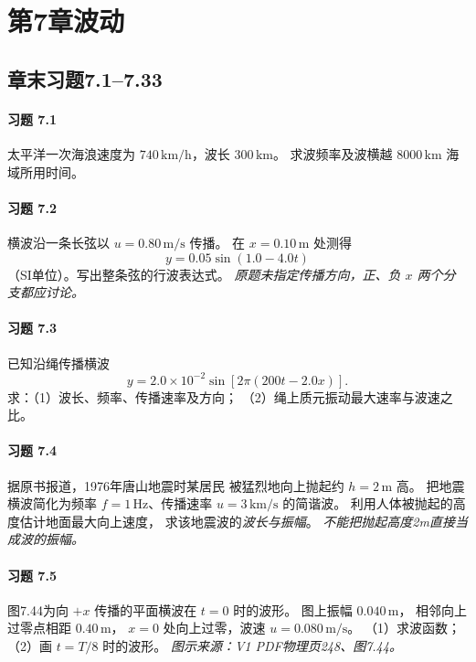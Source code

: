 \section*{第7章\quad 波动}
\subsection*{章末习题7.1--7.33}

\paragraph{习题 7.1}
太平洋一次海浪速度为
\(740\,\mathrm{km/h}\)，波长
\(300\,\mathrm{km}\)。
求波频率及波横越
\(8000\,\mathrm{km}\) 海域所用时间。

\paragraph{习题 7.2}
横波沿一条长弦以
\(u=0.80\,\mathrm{m/s}\) 传播。
在 \(x=0.10\,\mathrm m\) 处测得
\[
 y=0.05\sin(1.0-4.0t)
\]
（SI单位）。写出整条弦的行波表达式。
\textit{原题未指定传播方向，正、负 \(x\) 两个分支都应讨论。}

\paragraph{习题 7.3}
已知沿绳传播横波
\[
 y=2.0\times10^{-2}
 \sin[2\pi(200t-2.0x)].
\]
求：（1）波长、频率、传播速率及方向；
（2）绳上质元振动最大速率与波速之比。

\paragraph{习题 7.4}
据原书报道，1976年唐山地震时某居民
被猛烈地向上抛起约 \(h=2\,\mathrm m\) 高。
把地震横波简化为频率
\(f=1\,\mathrm{Hz}\)、传播速率
\(u=3\,\mathrm{km/s}\) 的简谐波。
利用人体被抛起的高度估计地面最大向上速度，
求该地震波的\emph{波长与振幅}。
\textit{不能把抛起高度2m直接当成波的振幅。}

\paragraph{习题 7.5}
图7.44为向 \(+x\) 传播的平面横波在
\(t=0\) 时的波形。
图上振幅 \(0.040\,\mathrm m\)，
相邻向上过零点相距 \(0.40\,\mathrm m\)，
\(x=0\) 处向上过零，波速
\(u=0.080\,\mathrm{m/s}\)。
（1）求波函数；（2）画
\(t=T/8\) 时的波形。
\textit{图示来源：V1 PDF物理页248、图7.44。}

